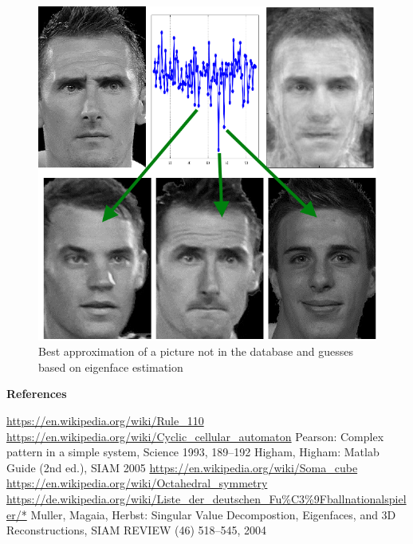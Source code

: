\documentclass{beamer}
\def\sect#1{\textbf{\color{blue} #1}}
\begin{document}
\begin{frame}[t]{}
\begin{multicols}{5}
\begin{figure}
\includegraphics[height=0.93\hsize]{KloseGuess.png} 
\caption{Best approximation of a picture not in the database and guesses based
         on eigenface estimation
        }
\end{figure}

\medskip

\sect{References}

\begin{thebibliography}{1}
 \url{https://en.wikipedia.org/wiki/Rule_110}
     \url{https://en.wikipedia.org/wiki/Cyclic_cellular_automaton}
 Pearson: Complex pattern in a simple system, Science 1993, 189--192
 Higham, Higham: Matlab Guide (2nd ed.), SIAM 2005
 \url{https://en.wikipedia.org/wiki/Soma_cube}
 \url{https://en.wikipedia.org/wiki/Octahedral_symmetry}
 \url{https://de.wikipedia.org/wiki/Liste_der_deutschen_Fu\%C3\%9Fballnationalspieler/*}
 Muller, Magaia, Herbst: Singular Value Decompostion, Eigenfaces,
               and 3D Reconstructions, SIAM REVIEW (46) 518--545, 2004
\end{thebibliography}

\end{multicols}
\end{frame}
\end{document}
